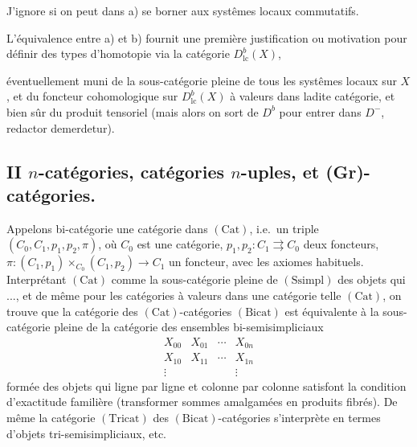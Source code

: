\documentclass[11pt,a4paper]{article}
\begin{document}

J'ignore si on peut dans a) se borner aux systêmes locaux commutatifs.

L'équivalence entre a) et b) fournit une première justification ou motivation
pour définir des types d'homotopie via la catégorie
$D^{b}_{\mathrm{lc}}(X)$,


éventuellement muni de la sous-catégorie pleine de tous les systêmes locaux sur
$X$, et du foncteur cohomologique sur $D^{b}_{\mathrm{lc}}(X)$ à valeurs dans
ladite catégorie, et bien sûr du produit tensoriel (mais alors on sort de
$D^{b}$ pour entrer dans $D^{-}$, redactor demerdetur).

\subsection*{II \quad $n$-catégories, catégories $n$-uples, et
(Gr)-catégories.}


Appelons bi-catégorie une catégorie dans $(\mathrm{Cat})$, i.e.\ un triple
$(C_{0}, C_{1}, p_{1}, p_{2}, \pi)$, où $C_{0}$ est une catégorie, $p_{1},
p_{2} : C_{1} \rightrightarrows C_{0}$ deux foncteurs, $\pi : (C_{1}, p_{1})
\times_{C_{0}} (C_{1}, p_{2}) \to C_{1}$ un foncteur, avec les axiomes
habituels. Interprétant $(\mathrm{Cat})$ comme la sous-catégorie pleine de
$(\mathrm{Ssimpl})$ des objets qui ..., et de même pour les catégories à
valeurs dans une catégorie telle $(\mathrm{Cat})$, on trouve que la catégorie
des $(\mathrm{Cat})$-catégories $(\mathrm{Bicat})$ est équivalente à la
sous-catégorie pleine de la catégorie des ensembles bi-semisimpliciaux
\[
\begin{array}{cccc}
X_{00} & X_{01} & \cdots & X_{0n} \\
X_{10} & X_{11} & \cdots & X_{1n} \\
\vdots & & & \vdots
\end{array}
\]
formée des objets qui ligne par ligne et colonne par colonne satisfont la
condition d'exactitude familière (transformer sommes amalgamées en produits
fibrés). De même la catégorie $(\mathrm{Tricat})$ des
$(\mathrm{Bicat})$-catégories s'interprète en termes d'objets
tri-semisimpliciaux, etc.
\end{document}
